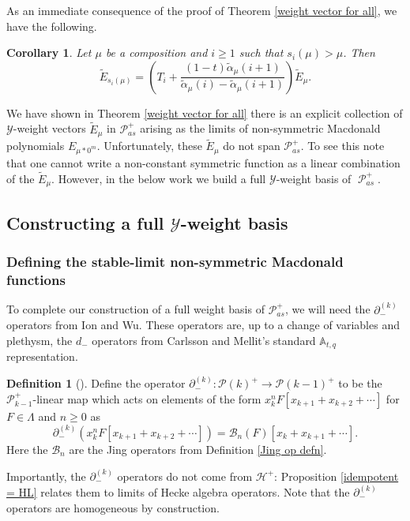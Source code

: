 \documentclass[11pt]{article}
\newtheorem{coro}[theo]{Corollary}
\theoremstyle{definition}
\newtheorem{defi}[theo]{Definition}
\numberwithin{equation}{section}
\newcommand{\y}{{ \mathscr{Y} }}
\DeclareMathOperator{\sP}{\mathscr{P} }
\begin{document}
As an immediate consequence of the proof of Theorem \ref{weight vector for all}, we have the following. 

\begin{coro}\label{action of T on E mu}
    Let $\mu$ be a composition and $i \geq 1$ such that $s_i(\mu) > \mu$. Then 
    $$\widetilde{E}_{s_i(\mu)} = \left(T_i + \frac{(1-t)\widetilde{\alpha}_{\mu}(i+1)}{\widetilde{\alpha}_{\mu}(i) - \widetilde{\alpha}_{\mu}(i+1)}\right) \widetilde{E}_{\mu}.$$
\end{coro}

We have shown in Theorem \ref{weight vector for all} there is an explicit collection of $\mathscr{Y}$-weight vectors $\widetilde{E}_{\mu}$ in $\mathscr{P}_{as}^{+}$ arising as the limits of non-symmetric Macdonald polynomials $E_{\mu * 0^m}$. Unfortunately, these $\widetilde{E}_{\mu}$ do not span $\mathscr{P}_{as}^{+}$. To see this note that one cannot write a non-constant symmetric function as a linear combination of the $\widetilde{E}_{\mu}$. However, in the below work we build a full $\y$-weight basis of $\sP_{as}^{+}$. 

\subsection{Constructing a full \texorpdfstring{$\y$}{Y}-weight basis}

\subsubsection{Defining the stable-limit non-symmetric Macdonald functions}
 To complete our construction of a full weight basis of $\mathscr{P}_{as}^{+}$, we will need the $\partial_{-}^{(k)}$ operators from Ion and Wu. These operators are, up to a change of variables and plethysm, the $d_{-}$ operators from Carlsson and Mellit's standard $\mathbb{A}_{t,q}$ representation. 

\begin{defi}[\cite{Ion_2022}] \label{defn7}
 Define the operator $\partial_{-}^{(k)}: \mathscr{P}(k)^{+} \rightarrow \mathscr{P}(k-1)^{+}$ to be the $\mathscr{P}_{k-1}^{+}$-linear map which acts on elements of the form $x_k^nF[x_{k+1}+x_{k+2}+ \cdots]$ for $F \in \Lambda$ and $n \geq 0$ as 
 $$\partial_{-}^{(k)}(x_k^nF[x_{k+1}+x_{k+2}+ \cdots]) = \mathscr{B}_n(F)[x_k + x_{k+1} + \cdots]. $$
 Here the $\mathscr{B}_n$ are the Jing operators from Definition \ref{Jing op defn}.
 
\end{defi}
 Importantly, the $\partial_{-}^{(k)}$ operators do not come from $\mathscr{H}^{+}$: Proposition \ref{idempotent = HL} relates them to limits of Hecke algebra operators. Note that the $\partial_{-}^{(k)}$ operators are homogeneous by construction. 
\end{document}

